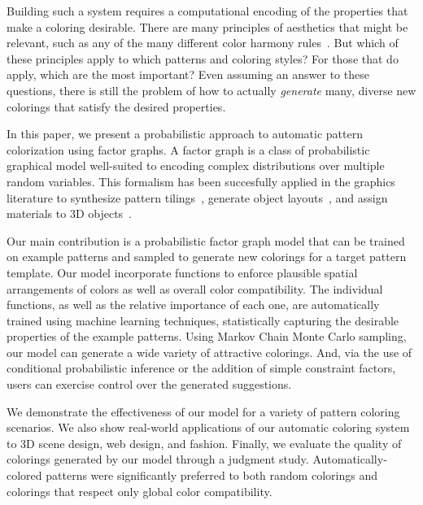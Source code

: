 Building such a system requires a computational encoding of the properties that make a coloring desirable. There are many principles of aesthetics that might be relevant, such as any of the many different color harmony rules~\cite{ColorHarmonyBook}. But which of these principles apply to which patterns and coloring styles? For those that do apply, which are the most important? Even assuming an answer to these questions, there is still the problem of how to actually \emph{generate} many, diverse new colorings that satisfy the desired properties.

In this paper, we present a probabilistic approach to automatic pattern colorization using factor graphs. A factor graph is a class of probabilistic graphical model well-suited to encoding complex distributions over multiple random variables. This formalism has been succesfully applied in the graphics literature to synthesize pattern tilings~\cite{YiTingTiledPatterns}, generate object layouts~\cite{YiTingLARJ}, and assign materials to 3D objects~\cite{MaterialMemex}.

Our main contribution is a probabilistic factor graph model that can be trained on example patterns and sampled to generate new colorings for a target pattern template. Our model incorporate functions to enforce plausible spatial arrangements of colors as well as overall color compatibility. The individual functions, as well as the relative importance of each one, are automatically trained using machine learning techniques, statistically capturing the desirable properties of the example patterns. Using Markov Chain Monte Carlo sampling, our model can generate a wide variety of attractive colorings. And, via the use of conditional probabilistic inference or the addition of simple constraint factors, users can exercise control over the generated suggestions.

We demonstrate the effectiveness of our model for a variety of pattern coloring scenarios. We also show real-world applications of our automatic coloring system to 3D scene design, web design, and fashion. Finally, we evaluate the quality of colorings generated by our model through a judgment study. Automatically-colored patterns were significantly preferred to both random colorings and colorings that respect only global color compatibility.